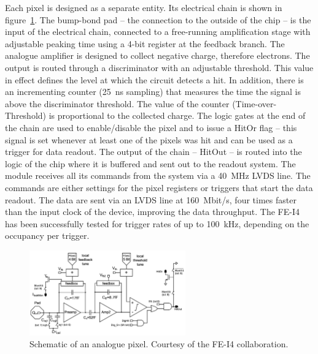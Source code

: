 Each pixel is designed as a separate entity. Its electrical chain is shown in figure~\ref{fig:anapix}. The bump-bond pad -- the connection to the outside of the chip -- is the input of the electrical chain, connected to a free-running amplification stage with adjustable peaking time using a 4-bit register at the feedback branch. The analogue amplifier is designed to collect negative charge, therefore electrons. The output is routed through a discriminator with an adjustable threshold. This value in effect defines the level at which the circuit detects a hit. In addition, there is an incrementing counter (25~ns sampling) that measures the time the signal is above the discriminator threshold. The value of the counter (Time-over-Threshold) is proportional to the collected charge. The logic gates at the end of the chain are used to enable/disable the pixel and to issue a HitOr flag -- this signal is set whenever at least one of the pixels was hit and can be used as a trigger for data readout. The output of the chain -- HitOut -- is routed into the logic of the chip where it is buffered and sent out to the readout system. The module receives all its commands from the system via a 40~MHz LVDS line. The commands are either settings for the pixel registers or triggers that start the data readout. The data are sent via an LVDS line at 160~Mbit/s, four times faster than the input clock of the device, improving the data throughput. The FE-I4 has been successfully tested for trigger rates of up to 100~kHz, depending on the occupancy per trigger. 

\begin{figure}[!t]
\centering
\includegraphics[width=0.6\textwidth]{04_charge_monitoring/pics/analogPix}
\caption{Schematic of an analogue pixel. Courtesy of the FE-I4 collaboration.}
\label{fig:anapix}
\end{figure}

